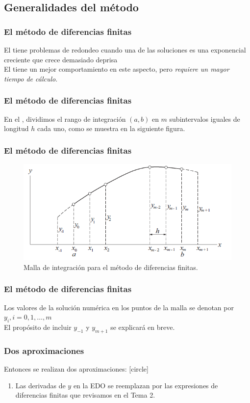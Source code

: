 \subsection{Generalidades del método}
\begin{frame}
\frametitle{El método de diferencias finitas}
El  tiene problemas de redondeo cuando una de las soluciones es
una exponencial creciente que crece demasiado deprisa
\\
\bigskip
El  tiene un mejor comportamiento en este aspecto, pero \emph{requiere un mayor tiempo de cálculo}.
\end{frame}
\begin{frame}
\frametitle{El método de diferencias finitas}
En el , dividimos el rango de integración $(a, b)$ en $m$ subintervalos iguales de longitud $h$ cada uno, como se muestra en la siguiente figura.
\end{frame}
\begin{frame}
\frametitle{El método de diferencias finitas}
\begin{figure}[h!]
    \centering
    \includegraphics[scale=0.6]{Imagenes/metodo_diferencias_finitas_01.png}
    \caption{Malla de integración para el método de diferencias finitas.}
\end{figure}
\end{frame}
\begin{frame}
\frametitle{El método de diferencias finitas}
Los valores de la solución numérica en los puntos de la malla se denotan por $y_{i}, i = 0, 1, \ldots, m$
\\
\bigskip
El propósito de incluir $y_{-1}$ y $y_{m+ 1}$ se explicará en breve.
\end{frame}
\begin{frame}
\frametitle{Dos aproximaciones}
Entonces se realizan dos aproximaciones:
[circle]
\begin{enumerate}[<+->]
\item Las derivadas de $y$ en la EDO se reemplazan por las expresiones de diferencias finitas que revisamos en el Tema 2.
\seti
\end{enumerate}
\end{frame}
